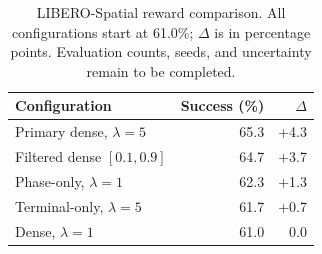 \begin{table}[t]
\caption{LIBERO-Spatial reward comparison. All configurations start at 61.0\%; $\Delta$ is in percentage points. Evaluation counts, seeds, and uncertainty remain to be completed.}
\label{tab:libero}\centering\small
\begin{tabular}{@{}lrr@{}}\toprule
Configuration & Success (\%) & $\Delta$\\\midrule
Primary dense, $\lambda=5$ & 65.3 & +4.3\\
Filtered dense $[0.1,0.9]$ & 64.7 & +3.7\\
Phase-only, $\lambda=1$ & 62.3 & +1.3\\
Terminal-only, $\lambda=5$ & 61.7 & +0.7\\
Dense, $\lambda=1$ & 61.0 & 0.0\\\bottomrule
\end{tabular}
\end{table}
